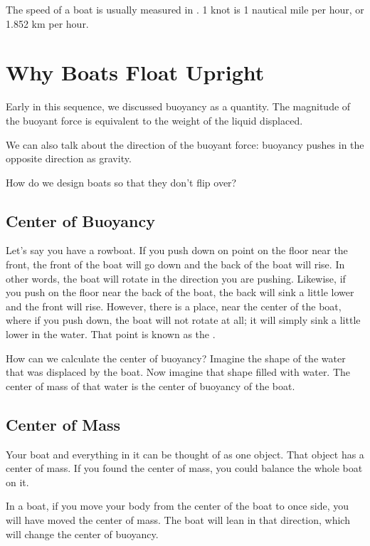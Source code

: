 The speed of a boat is usually measured in . 1 knot is 1 nautical mile per hour, or 1.852 km per hour.

\section{Why Boats Float Upright}

Early in this sequence, we discussed buoyancy as a quantity. The magnitude of the buoyant force is equivalent to the weight of the liquid displaced.

We can also talk about the direction of the buoyant force: buoyancy pushes in the opposite direction as gravity.

How do we design boats so that they don't flip over?

\subsection{Center of Buoyancy}

Let's say you have a rowboat. If you push down on point on the floor near the front, the front of the boat will go down and the back of the boat will rise. In other words, the boat will rotate in the direction you are pushing. 
Likewise, if you push on the floor near the back of the boat, the back will sink a little lower and the front will rise. However, there is a place, near the center of the boat, where if you push down, the boat will not rotate at all; it will simply sink a little lower
in the water. That point is known as the .

How can we calculate the center of buoyancy?  Imagine the shape of the water that was displaced by the boat. Now imagine that shape filled with water. The center of mass of that water is the center of buoyancy of the boat.

\subsection{Center of Mass}
Your boat and everything in it can be thought of as one object.  That object has a center of mass. If you found the center of mass, you could balance the whole boat on it.

In a boat,  if you move your body from the center of the boat to once side, you will have moved the center of mass. The boat will lean in that direction, which will change the center of buoyancy. 

